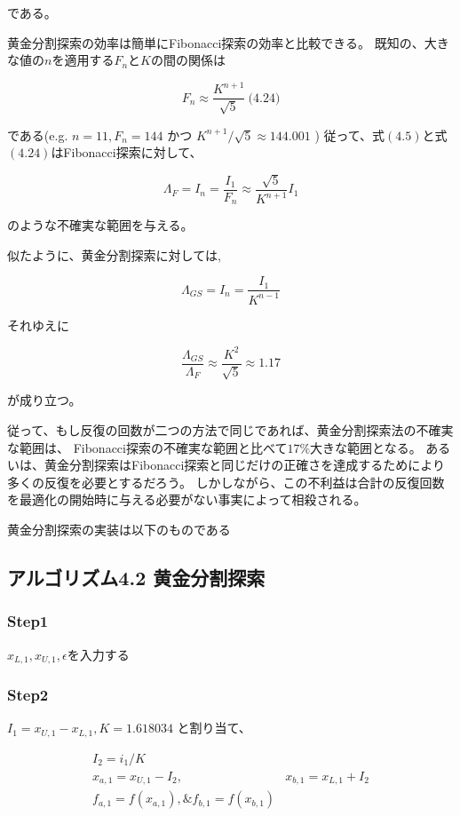 である。

黄金分割探索の効率は簡単にFibonacci探索の効率と比較できる。
既知の、大きな値の$n$を適用する$F_n$と$K$の間の関係は

$$F_n \approx
\frac{K^{n+1}}{\sqrt{5}}
\ \text{(4.24)}$$

である(e.g. $n=11, F_n =144$ かつ $K^{n+1} /
\sqrt{5} \approx 144.001$ )
従って、式$(4.5)$と式$(4.24)$はFibonacci探索に対して、

$$ \Lambda_F = I_n =
\frac{I_1}{F_n} \approx
\frac{\sqrt{5}}{K^{n+1}} I_1
$$

のような不確実な範囲を与える。

似たように、黄金分割探索に対しては,

$$\Lambda_{GS} = I_n =
\frac{I_1}{K^{n-1}}$$

それゆえに

$$
\frac{\Lambda_{GS}}{\Lambda_F}
\approx \frac{K^2}{\sqrt{5}}
\approx 1.17 $$

が成り立つ。

従って、もし反復の回数が二つの方法で同じであれば、黄金分割探索法の不確実な範囲は、
Fibonacci探索の不確実な範囲と比べて$17\%$大きな範囲となる。
あるいは、黄金分割探索はFibonacci探索と同じだけの正確さを達成するためにより多くの反復を必要とするだろう。
しかしながら、この不利益は合計の反復回数を最適化の開始時に与える必要がない事実によって相殺される。

黄金分割探索の実装は以下のものである

\newpage

\subsection*{アルゴリズム4.2 黄金分割探索}\label{-4-2-}

\subsubsection*{Step1}\label{step1}

$x_{L,1}, x_{U,1}, \epsilon$を入力する

\subsubsection*{Step2}\label{step2}

$I_1 = x_{U,1} - x_{L,1}, K = 1.618034$ と割り当て、

$$ \begin{array}{cc} I_2 = i_1 / K
\\ x_{a,1} = x_{U,1} - I_2, &
x_{b,1} = x_{L,1} + I_2 \\
f_{a,1} = f(x_{a,1}), \& f_{b,1} = f(x_{b,1})
\end{array} $$

